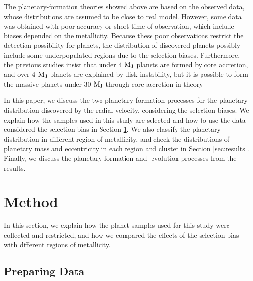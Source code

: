 \documentclass[twocolumn, dvipdfmx]{aastex62}
\begin{document}
\begin{CJK*}{UTF8}{min}
The planetary-formation theories showed above are based on the observed data, whose distributions are assumed to be close to real model. However, some data was obtained with poor accuracy or short time of observation, which include biases depended on the metallicity. Because these poor observations restrict the detection possibility for planets, the distribution of discovered planets possibly include some underpopulated regions due to the selection biases. Furthermore, the previous studies insist that under 4 $\rm M_J$ planets are formed by core accretion, and over 4 $\rm M_J$ planets are explained by disk instability, but it is possible to form the massive planets under 30 $\rm M_J$ through core accretion in theory \citep[e.g.,][]{2009A&A...501.1161M, 2016ApJ...823...48T}

In this paper, we discuss the two planetary-formation processes for the planetary distribution discovered by the radial velocity, considering the selection biases. We explain how the samples used in this study are selected and how to use the data considered the selection bias in Section \ref{sec:method}. We also classify the planetary distribution in different region of metallicity, and check the distributions of planetary mass and eccentricity in each region and cluster in Section \ref{sec:results}. Finally, we discuss the planetary-formation and -evolution processes from the results.


\section{Method} \label{sec:method}

In this section, we explain how the planet samples used for this study were collected and restricted, and how we compared the effects of the selection bias with different regions of metallicity.


\subsection{Preparing Data} \label{subsec:prepare}


\end{CJK*}
\end{document}
